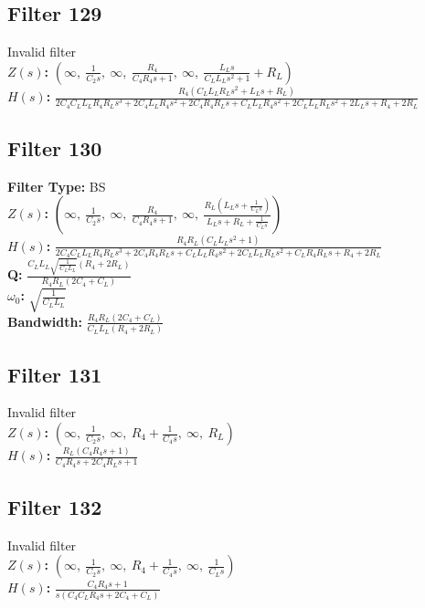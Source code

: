 \documentclass{article}
\begin{document}
\subsection*{Filter 129}
Invalid filter \\ 
\textbf{$Z(s)$:} $\left( \infty, \  \frac{1}{C_{2} s}, \  \infty, \  \frac{R_{4}}{C_{4} R_{4} s + 1}, \  \infty, \  \frac{L_{L} s}{C_{L} L_{L} s^{2} + 1} + R_{L}\right)$ \\ 
\textbf{$H(s)$:} $\frac{R_{4} \left(C_{L} L_{L} R_{L} s^{2} + L_{L} s + R_{L}\right)}{2 C_{4} C_{L} L_{L} R_{4} R_{L} s^{3} + 2 C_{4} L_{L} R_{4} s^{2} + 2 C_{4} R_{4} R_{L} s + C_{L} L_{L} R_{4} s^{2} + 2 C_{L} L_{L} R_{L} s^{2} + 2 L_{L} s + R_{4} + 2 R_{L}}$ \\ 
\subsection*{Filter 130}
\textbf{Filter Type:} BS \\ 
\textbf{$Z(s)$:} $\left( \infty, \  \frac{1}{C_{2} s}, \  \infty, \  \frac{R_{4}}{C_{4} R_{4} s + 1}, \  \infty, \  \frac{R_{L} \left(L_{L} s + \frac{1}{C_{L} s}\right)}{L_{L} s + R_{L} + \frac{1}{C_{L} s}}\right)$ \\ 
\textbf{$H(s)$:} $\frac{R_{4} R_{L} \left(C_{L} L_{L} s^{2} + 1\right)}{2 C_{4} C_{L} L_{L} R_{4} R_{L} s^{3} + 2 C_{4} R_{4} R_{L} s + C_{L} L_{L} R_{4} s^{2} + 2 C_{L} L_{L} R_{L} s^{2} + C_{L} R_{4} R_{L} s + R_{4} + 2 R_{L}}$ \\ 
\textbf{Q:} $\frac{C_{L} L_{L} \sqrt{\frac{1}{C_{L} L_{L}}} \left(R_{4} + 2 R_{L}\right)}{R_{4} R_{L} \left(2 C_{4} + C_{L}\right)}$ \\ 
\textbf{$\omega_0$:} $\sqrt{\frac{1}{C_{L} L_{L}}}$ \\ 
\textbf{Bandwidth:} $\frac{R_{4} R_{L} \left(2 C_{4} + C_{L}\right)}{C_{L} L_{L} \left(R_{4} + 2 R_{L}\right)}$ \\ 
\subsection*{Filter 131}
Invalid filter \\ 
\textbf{$Z(s)$:} $\left( \infty, \  \frac{1}{C_{2} s}, \  \infty, \  R_{4} + \frac{1}{C_{4} s}, \  \infty, \  R_{L}\right)$ \\ 
\textbf{$H(s)$:} $\frac{R_{L} \left(C_{4} R_{4} s + 1\right)}{C_{4} R_{4} s + 2 C_{4} R_{L} s + 1}$ \\ 
\subsection*{Filter 132}
Invalid filter \\ 
\textbf{$Z(s)$:} $\left( \infty, \  \frac{1}{C_{2} s}, \  \infty, \  R_{4} + \frac{1}{C_{4} s}, \  \infty, \  \frac{1}{C_{L} s}\right)$ \\ 
\textbf{$H(s)$:} $\frac{C_{4} R_{4} s + 1}{s \left(C_{4} C_{L} R_{4} s + 2 C_{4} + C_{L}\right)}$ \\ 
\end{document}
